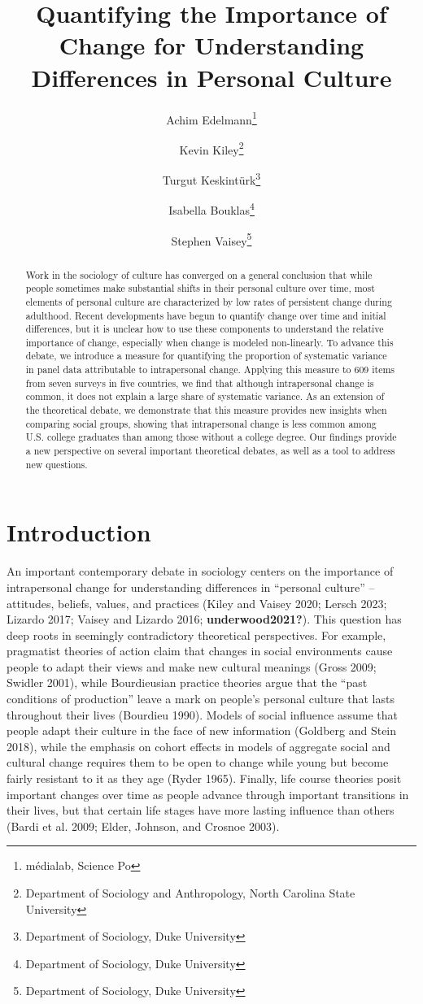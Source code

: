 \documentclass[
  12pt,
]{article}
\title{Quantifying the Importance of Change for Understanding
Differences in Personal Culture}
\author{Achim Edelmann\footnote{médialab, Science Po} \and Kevin
Kiley\footnote{Department of Sociology and Anthropology, North Carolina
  State University} \and Turgut Keskintürk\footnote{Department of
  Sociology, Duke University} \and Isabella
Bouklas\footnote{Department of Sociology, Duke University} \and Stephen
Vaisey\footnote{Department of Sociology, Duke University}}
\date{}
\begin{document}
\maketitle
\begin{abstract}
Work in the sociology of culture has converged on a general conclusion
that while people sometimes make substantial shifts in their personal
culture over time, most elements of personal culture are characterized
by low rates of persistent change during adulthood. Recent developments
have begun to quantify change over time and initial differences, but it
is unclear how to use these components to understand the relative
importance of change, especially when change is modeled non-linearly. To
advance this debate, we introduce a measure for quantifying the
proportion of systematic variance in panel data attributable to
intrapersonal change. Applying this measure to 609 items from seven
surveys in five countries, we find that although intrapersonal change is
common, it does not explain a large share of systematic variance. As an
extension of the theoretical debate, we demonstrate that this measure
provides new insights when comparing social groups, showing that
intrapersonal change is less common among U.S. college graduates than
among those without a college degree. Our findings provide a new
perspective on several important theoretical debates, as well as a tool
to address new questions.
\end{abstract}

\doublespacing

\hypertarget{introduction}{%
\section{Introduction}\label{introduction}}

An important contemporary debate in sociology centers on the importance
of intrapersonal change for understanding differences in ``personal
culture'' -- attitudes, beliefs, values, and practices (Kiley and Vaisey
2020; Lersch 2023; Lizardo 2017; Vaisey and Lizardo 2016;
\textbf{underwood2021?}). This question has deep roots in seemingly
contradictory theoretical perspectives. For example, pragmatist theories
of action claim that changes in social environments cause people to
adapt their views and make new cultural meanings (Gross 2009; Swidler
2001), while Bourdieusian practice theories argue that the ``past
conditions of production'' leave a mark on people's personal culture
that lasts throughout their lives (Bourdieu 1990). Models of social
influence assume that people adapt their culture in the face of new
information (Goldberg and Stein 2018), while the emphasis on cohort
effects in models of aggregate social and cultural change requires them
to be open to change while young but become fairly resistant to it as
they age (Ryder 1965). Finally, life course theories posit important
changes over time as people advance through important transitions in
their lives, but that certain life stages have more lasting influence
than others (Bardi et al. 2009; Elder, Johnson, and Crosnoe 2003).
\end{document}
